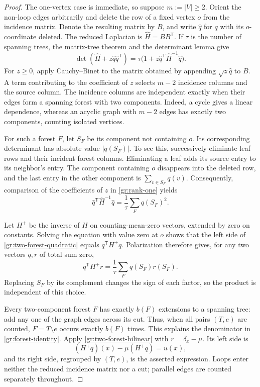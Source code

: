\begin{proof}
The one-vertex case is immediate, so suppose $m:=|V|\geq2$.
Orient the non-loop edges arbitrarily and delete the row of a fixed
vertex $o$ from the incidence matrix.  Denote the resulting matrix by
$B$, and write $\widehat q$ for $q$ with its $o$-coordinate deleted.
The reduced Laplacian is $\widehat H=BB^{\mathsf T}$.  If $\tau$ is
the number of spanning trees, the matrix-tree theorem and the
determinant lemma give
\begin{equation}\label{gr:rank-one}
 \det(\widehat H+z\widehat q\widehat q^{\mathsf T})
       =\tau\bigl(1+z\widehat q^{\mathsf T}
                            \widehat H^{-1}\widehat q\bigr).
\end{equation}
For $z\geq0$, apply Cauchy--Binet to the matrix obtained by appending
$\sqrt z\widehat q$ to $B$.  A term contributing to the coefficient
of $z$ selects $m-2$ incidence columns and the source column.
The incidence columns are independent exactly when their edges form
a spanning forest with two components.  Indeed, a cycle gives a
linear dependence, whereas an acyclic graph with $m-2$ edges has
exactly two components, counting isolated vertices.

For such a forest $F$, let $S_F$ be its component not containing $o$.
Its corresponding determinant has absolute value $|q(S_F)|$.
To see this, successively eliminate leaf rows and their incident
forest columns.  Eliminating a leaf adds its source entry to its
neighbor's entry.  The component containing $o$ disappears into the
deleted row, and the last entry in the other component is
$\sum_{v\in S_F}q(v)$.  Consequently, comparison of the coefficients
of $z$ in \eqref{gr:rank-one} yields
\begin{equation}\label{gr:two-forest-quadratic}
 \widehat q^{\mathsf T}\widehat H^{-1}\widehat q
       =\frac1\tau\sum_F q(S_F)^2.
\end{equation}

Let $H^+$ be the inverse of $H$ on counting-mean-zero vectors,
extended by zero on constants.  Solving the equation with value zero
at $o$ shows that the left side of
\eqref{gr:two-forest-quadratic} equals $q^{\mathsf T}H^+q$.
Polarization therefore gives, for any two vectors $q,r$ of total
sum zero,
\begin{equation}\label{gr:two-forest-bilinear}
 q^{\mathsf T}H^+r=\frac1\tau\sum_F q(S_F)r(S_F).
\end{equation}
Replacing $S_F$ by its complement changes the sign of each factor,
so the product is independent of this choice.

Every two-component forest $F$ has exactly $b(F)$ extensions to a
spanning tree: add any one of the graph edges across its cut.
Thus, when all pairs $(T,e)$ are counted, $F=T\setminus e$ occurs
exactly $b(F)$ times.  This explains the denominator in
\eqref{gr:forest-identity}.  Apply \eqref{gr:two-forest-bilinear}
with $r=\delta_x-\mu$.  Its left side is
\[
 (H^+q)(x)-\mu(H^+q)=u(x),
\]
and its right side, regrouped by $(T,e)$, is the asserted expression.
Loops enter neither the reduced incidence matrix nor a cut; parallel
edges are counted separately throughout.
\end{proof}


